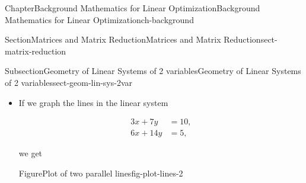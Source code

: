 \documentclass[oneside,10pt,]{book}
\newcommand{\terminology}[1]{\textbf{#1}}
\numberwithin{equation}{section}
\newcommand{\amp}{&}
\begin{document}
\begin{chapterptx}{Chapter}{Background Mathematics for Linear Optimization}{}{Background Mathematics for Linear Optimization}{}{}{ch-background}
\begin{sectionptx}{Section}{Matrices and Matrix Reduction}{}{Matrices and Matrix Reduction}{}{}{sect-matrix-reduction}
\begin{subsectionptx}{Subsection}{Geometry of Linear Systems of 2 variables}{}{Geometry of Linear Systems of 2 variables}{}{}{sect-geom-lin-sys-2var}
\begin{itemize}[label=\textbullet]
\par
%
\begin{equation}
\begin{aligned} x + 2 y \amp = 5, \\ 2x - 3 y \amp = -4, \end{aligned}\label{eq-linear-system-geom1}
\end{equation}
%
\par
is%
\begin{figureptx}{Figure}{Plot of two intersecting lines}{fig-plot-lines}{}%
\begin{image}{0.125}{0.75}{0.125}{}%
%
\end{image}%
\tcblower
\end{figureptx}%
The solution of the system is the point at which they cross. In this case it looks like the point \((1,2)\) or \(x=1\) and \(y=2\). This is an example where there is only one solution (or a \terminology{unique solution}).%
\item{}If we graph the lines in the linear system%
\par
%
\begin{equation}
\begin{aligned} 3x + 7 y \amp= 10, \\ 6 x + 14 y \amp= 5, \end{aligned}\label{eq-linear-system-geom2}
\end{equation}
%
\par
we get%
\begin{figureptx}{Figure}{Plot of two parallel lines}{fig-plot-lines-2}{}%
\begin{image}{0.125}{0.75}{0.125}{}%
\end{image}
\end{figureptx}
\end{itemize}
\end{subsectionptx}
\end{sectionptx}
\end{chapterptx}
\end{document}
